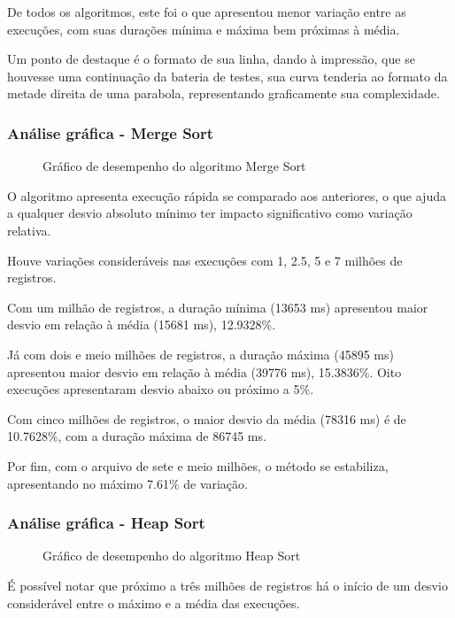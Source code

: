 \documentclass[a4paper,12pt]{scrartcl}
\begin{document}
De todos os algoritmos, este foi o que apresentou menor variação entre as execuções, com suas durações mínima e máxima bem próximas à média.

Um ponto de destaque é o formato de sua linha, dando à impressão, que se houvesse uma continuação da bateria de testes, sua curva tenderia ao formato da metade direita de uma parabola, representando graficamente sua complexidade.

\subsubsection{Análise gráfica - Merge Sort}
\begin{figure}[H]
    \centering
    
    \caption{Gráfico de desempenho do algoritmo Merge Sort}
    \label{mapaSelect}
\end{figure}

O algoritmo apresenta execução rápida se comparado aos anteriores, o que ajuda a qualquer desvio absoluto mínimo ter impacto significativo como variação relativa.

Houve variações consideráveis nas execuções com 1, 2.5, 5 e 7 milhões de registros.

Com um milhão de registros, a duração mínima (13653 ms) apresentou maior desvio em relação à média (15681 ms), 12.9328\%.

Já com dois e meio milhões de registros, a duração máxima (45895 ms) apresentou maior desvio em relação à média (39776 ms), 15.3836\%. Oito execuções apresentaram desvio abaixo ou próximo a 5\%.

Com cinco milhões de registros, o maior desvio da média (78316 ms) é de 10.7628\%, com a duração máxima de 86745 ms.

Por fim, com o arquivo de sete e meio milhões, o método se estabiliza, apresentando no máximo 7.61\% de variação.

\subsubsection{Análise gráfica - Heap Sort}
\begin{figure}[H]
    \centering
    
    \caption{Gráfico de desempenho do algoritmo Heap Sort}
    \label{mapaSelect}
\end{figure}

É possível notar que próximo a três milhões de registros há o início de um desvio considerável entre o máximo e a média das execuções.
\end{document}
